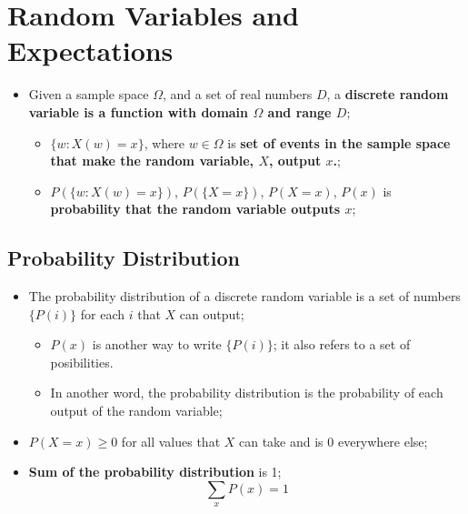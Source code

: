 \chapter{Random Variables and Expectations}

\begin{itemize}
  \item Given a sample space $ \Omega $, and a set of real numbers $ D $, a \textbf{discrete random variable is a function with domain $ \Omega $ and range $ D $};
  \begin{itemize}
    \item $ \{ w : X(w) = x \} $, where $ w \in \Omega $ is \textbf{set of events in the sample space that make the random variable, $ X $, output $ x $.};
    \item $ P \left(\{ w : X(w) = x \}\right) $, $ P \left(\{ X = x \}\right) $, $ P \left( X = x \right) $, $ P \left( x \right) $ is \textbf{probability that the random variable outputs $ x $};
  \end{itemize}
\end{itemize}

\section{Probability Distribution}

  \begin{itemize}
    \item The probability distribution of a discrete random variable is a set of numbers $ \{ P \left( i \right) \} $ for each $ i $ that $ X $ can output;
    \begin{itemize}
      \item $ P \left( x \right) $ is another way to write $ \{ P \left( i \right) \} $; it also refers to a set of posibilities.
      \item In another word, the probability distribution is the probability of each output of the random variable;
    \end{itemize}
    
    \item $ P(X = x) \geq 0 $ for all values that $ X $ can take and is 0 everywhere else;

    \item \textbf{Sum of the probability distribution} is 1;
    \begin{equation}
      \sum_{x} P (x) = 1
    \end{equation}
  \end{itemize}
  
